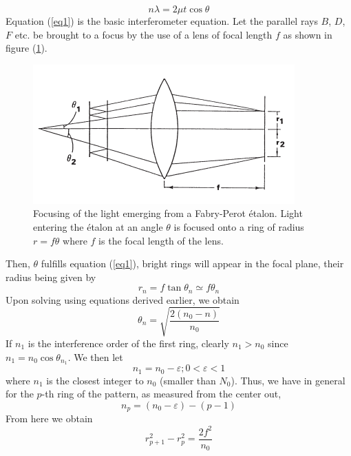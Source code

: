 \documentclass[%
 reprint,
nofootinbib,
 amsmath,amssymb,
 aps,
floatfix,
]{revtex4-2}
\begin{document}
    \begin{equation}
    \label{eq1}
        n \lambda = 2 \mu t \cos \theta
    \end{equation}
    Equation (\ref{eq1}) is the basic interferometer equation. Let the parallel rays $B$, $D$, $F$ etc. be brought to a focus by the use of a lens of focal length $f$ as shown in figure (\ref{fig:focus}).
    \begin{figure}
        \centering
        \includegraphics{Figures/focus.png}
        \caption{Focusing of the light emerging from a Fabry-Perot étalon. Light entering the étalon at an angle $\theta$ is focused onto a ring of radius $r = f \theta$ where $f$ is the focal length of the lens.}
        \label{fig:focus}
    \end{figure}
    Then, $\theta$ fulfills equation (\ref{eq1}), bright rings will appear in the focal plane, their radius being given by
    \begin{equation}
        r_n = f \tan \theta_n \simeq f \theta_n
    \end{equation}
    Upon solving using equations derived earlier, we obtain
    \begin{equation}
        \theta_n = \sqrt{\dfrac{2(n_0 - n)}{n_0}}
    \end{equation}
     If $n_1$ is the interference order of the first ring, clearly $n_1 > n_0$ since $n_1 = n_0 \cos \theta_{n_1}$. We then let
    \begin{equation}
        n_1 = n_0 - \varepsilon; 0 < \varepsilon < 1
    \end{equation}
    where $n_1$ is the closest integer to $n_0$ (smaller than $N_0$). Thus, we have in general for the $p$-th ring of the pattern, as measured from the center out,
    \begin{equation}
        n_p = (n_0 - \varepsilon) - (p-1)
    \end{equation}
    From here we obtain
    \begin{equation}
        r_{p+1}^2 - r_p^2 = \dfrac{2f^2}{n_0}
    \end{equation}
\end{document}
